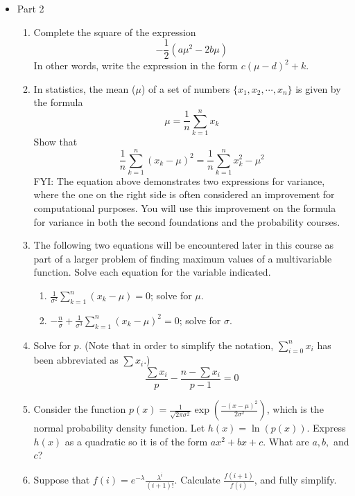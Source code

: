 \documentclass{article}
\begin{document}
\begin{itemize}
\begin{enumerate}
                \end{enumerate}
            \item Part 2
                \begin{enumerate}
                    \item Complete the square of the expression $$-\frac{1}{2}(a\mu^2-2b\mu)$$  In other words, write the expression in the form $c(\mu-d)^2+k$.
                    \item In statistics, the mean ($\mu$) of a set of numbers $\{x_1, x_2, \cdots, x_n\}$ is given by the formula $$\mu = \frac{1}{n}\sum_{k=1}^n x_k$$  Show that $$\frac{1}{n}\sum_{k=1}^n (x_k-\mu)^2 = \frac{1}{n}\sum_{k=1}^n x_k^2-\mu^2$$  FYI: The equation above demonstrates two expressions for variance, where the one on the right side is often considered an improvement for computational purposes.  You will use this improvement on the formula for variance in both the second foundations and the probability courses.
                    \item The following two equations will be encountered later in this course as part of a larger problem of finding maximum values of a multivariable function.  Solve each equation for the variable indicated. 
                       \begin{enumerate}
                           \item $\displaystyle \frac{1}{\sigma^2}\sum_{k=1}^{n}(x_k-\mu)=0$; solve for $\mu$.
                           \item $\displaystyle -\frac{n}{\sigma}+\frac{1}{\sigma^3}\sum_{k=1}^{n}(x_k-\mu)^2=0$; solve for $\sigma$.
                       \end{enumerate} 
                    \item  Solve for $p$. (Note that in order to simplify the notation, $\displaystyle \sum_{i=0}^n x_i$ has been abbreviated as  $\sum x_i$.) $$\displaystyle \frac{\sum x_i }{p} - \frac{n-\sum x_i}{p-1}=0 $$
                    \item Consider the function $\displaystyle p(x) = \frac{1}{\sqrt{2\pi \sigma^2}}\exp\left( \frac{-(x-\mu)^2}{2\sigma^2}\right)$, which is the normal probability density function.  Let $h(x) = \ln(p(x))$.  Express $h(x)$ as a quadratic so it is of the form $ax^2+bx+c$. What are $a,b,$ and $c$? 
                    \item Suppose that $\displaystyle f(i)= e^{-\lambda}\frac{\lambda^i}{(i+1)!}$.  Calculate $\displaystyle \frac{f(i+1)}{f(i)}$, and fully simplify.

\end{enumerate}
\end{itemize}
\end{document}
